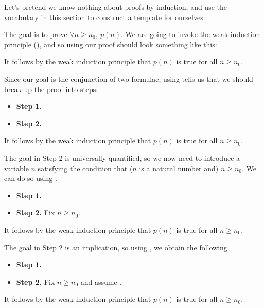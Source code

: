 Let's pretend we know nothing about proofs by induction, and use the vocabulary in this section to construct a template for ourselves.

The goal is to prove $\forall n \ge n_0,~ p(n)$. We are going to invoke the weak induction principle (), and so using  our proof should look something like this:

\begin{snippet}

It follows by the weak induction principle that $p(n)$ is true for all $n \ge n_0$.
\end{snippet}

Since our goal is the conjunction of two formulae, using  tells us that we should break up the proof into steps:

\begin{snippet}
\begin{itemize}
\item \textbf{Step 1.} 
\item \textbf{Step 2.} 
\end{itemize}

It follows by the weak induction principle that $p(n)$ is true for all $n \ge n_0$.
\end{snippet}

The goal in Step 2 is universally quantified, so we now need to introduce a variable $n$ satisfying the condition that ($n$ is a natural number and) $n \ge n_0$. We can do so using .

\begin{snippet}
\begin{itemize}
\item \textbf{Step 1.} 
\item \textbf{Step 2.} Fix $n \ge n_0$. 
\end{itemize}

It follows by the weak induction principle that $p(n)$ is true for all $n \ge n_0$.
\end{snippet}

The goal in Step 2 is an implication, so using , we obtain the following.

\begin{snippet}
\begin{itemize}
\item \textbf{Step 1.} 
\item \textbf{Step 2.} Fix $n \ge n_0$ and assume .

\end{itemize}

It follows by the weak induction principle that $p(n)$ is true for all $n \ge n_0$.
\end{snippet}


